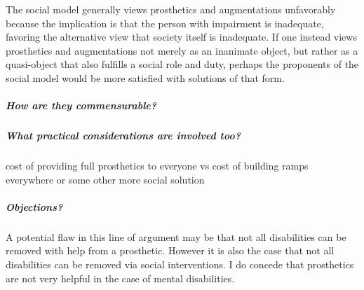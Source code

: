 \documentclass[a4paper]{article}
\begin{document}
The social model generally views prosthetics and augmentations
unfavorably because the implication is that the person with impairment is
inadequate, favoring the alternative view that society itself is inadequate.
If one instead views prosthetics and augmentations not merely as an inanimate
object, but rather as a quasi-object that also fulfills a social role and
duty, perhaps the proponents of the social model would be more satisfied with
solutions of that form.

\subparagraph{How are they commensurable?}

\subparagraph{What practical considerations are involved too?}

cost of providing full prosthetics to everyone vs cost of building ramps
everywhere or some other more social solution

\subparagraph{Objections?}

A potential flaw in this line of argument may be that not all disabilities can
be removed with help from a prosthetic. However it is also the case that not
all disabilities can be removed via social interventions. I do concede that
prosthetics are not very helpful in the case of mental disabilities. 





\cleardoublepage


%
%

\end{document}
